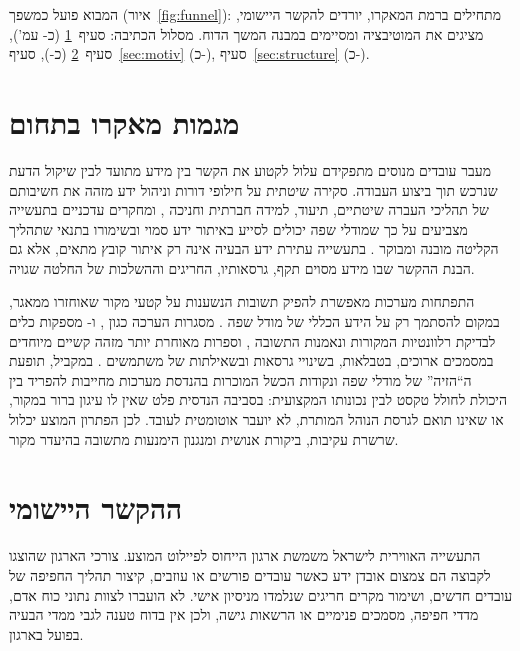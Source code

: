 \begin{pcguide}
המבוא פועל כמשפך (איור~\ref{fig:funnel}): מתחילים ברמת המאקרו, יורדים להקשר היישומי, מציגים את המוטיבציה
ומסיימים במבנה המשך הדוח. מסלול הכתיבה: סעיף~\ref{sec:macro} (כ- עמ'), סעיף~\ref{sec:applied} (כ-),
סעיף~\ref{sec:motiv} (כ-), סעיף~\ref{sec:structure} (כ-).
\end{pcguide}

\section{מגמות מאקרו בתחום}\label{sec:macro}
מעבר עובדים מנוסים מתפקידם עלול לקטוע את הקשר בין מידע מתועד לבין שיקול הדעת שנרכש תוך ביצוע העבודה.
סקירה שיטתית על חילופי דורות וניהול ידע מזהה את חשיבותם של תהליכי העברה שיטתיים, תיעוד, למידה חברתית וחניכה
\cite{igoa2024transfer}, ומחקרים עדכניים בתעשייה מצביעים על כך שמודלי שפה יכולים לסייע באיתור ידע סמוי ובשימורו
בתנאי שתהליך הקליטה מובנה ומבוקר \cite{finkel2026unlocking,zuin2025tacit}. בתעשייה עתירת ידע הבעיה אינה רק איתור
קובץ מתאים, אלא גם הבנת ההקשר שבו מידע מסוים תקף, גרסאותיו, החריגים וההשלכות של החלטה שגויה.

התפתחות מערכות  מאפשרת להפיק תשובות הנשענות על קטעי מקור שאוחזרו ממאגר,
במקום להסתמך רק על הידע הכללי של מודל שפה \cite{lewis2020retrieval}. מסגרות הערכה כגון , 
ו- מספקות כלים לבדיקת רלוונטיות המקורות ונאמנות התשובה \cite{es2024ragas,saad2024ares,rau2024bergen},
וספרות מאוחרת יותר מזהה קשיים מיוחדים במסמכים ארוכים, בטבלאות, בשינויי גרסאות ובשאילתות של משתמשים
\cite{tao2025treerag,strich2026t2,zheng2025knowshift}. במקביל, תופעת ה“הזיה” של מודלי שפה
\cite{ji2023survey} ונקודות הכשל המוכרות בהנדסת מערכות  \cite{barnett2024seven} מחייבות להפריד בין היכולת לחולל
טקסט לבין נכונותו המקצועית: בסביבה הנדסית פלט שאין לו עיגון ברור במקור, או שאינו תואם לגרסת הנוהל המותרת, לא יועבר
אוטומטית לעובד. לכן הפתרון המוצע יכלול שרשרת עקיבות, ביקורת אנושית ומנגנון הימנעות מתשובה בהיעדר מקור.

\section{ההקשר היישומי}\label{sec:applied}
התעשייה האווירית לישראל  משמשת ארגון הייחוס לפיילוט המוצע. צורכי הארגון שהוצגו לקבוצה הם צמצום אובדן
ידע כאשר עובדים פורשים או עוזבים, קיצור תהליך החפיפה של עובדים חדשים, ושימור מקרים חריגים שנלמדו מניסיון אישי.
לא הועברו לצוות נתוני כוח אדם, מדדי חפיפה, מסמכים פנימיים או הרשאות גישה, ולכן אין בדוח טענה לגבי ממדי הבעיה בפועל
בארגון.

